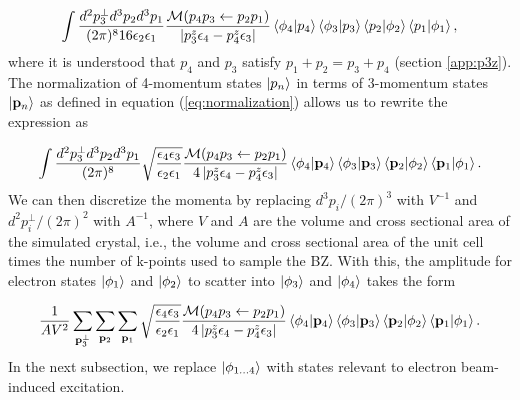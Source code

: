 \documentclass{article}
\begin{document}
\begin{equation} 
  \label{eq:ampUseDelta} 
  \begin{aligned} 
    \int\frac{d^2p_3^\perp
    d^3p_2d^3p_1} {(2\pi)^{8} 16\epsilon_2\epsilon_1}
    \frac{\mathcal{M}(p_4p_3\leftarrow p_2p_1)}
    {\left|p_3^z\epsilon_4 - p_4^z\epsilon_3\right|} \bra{\phi_4}\ket{p_4}
    \bra{\phi_3}\ket{p_3} \bra{p_2}\ket{\phi_2} \bra{p_1}\ket{\phi_1},
  \end{aligned} 
\end{equation}
%
where it is understood that $p_4$ and $p_3$ satisfy $p_1 + p_2 = p_3 + p_4$
(section \ref{app:p3z}).
The normalization of 4-momentum states $\ket{p_n}$ in terms of
3-momentum states $\ket{\mathbf{p}_n}$ as defined in equation
(\ref{eq:normalization}) allows us to rewrite the expression as

\begin{equation} 
  \label{eq:amp3Mom} 
  \begin{aligned} 
    \int\frac{d^2p_3^\perp
    d^3p_2d^3p_1}{(2\pi)^{8}}
    \sqrt{\frac{\epsilon_4\epsilon_3}{\epsilon_2\epsilon_1}}
    \frac{\mathcal{M}(p_4p_3\leftarrow p_2p_1)} {4\left|p_3^z\epsilon_4 -
    p_4^z\epsilon_3\right|} \bra{\phi_4}\ket{\mathbf{p}_4}
    \bra{\phi_3}\ket{\mathbf{p}_3} \bra{\mathbf{p}_2}\ket{\phi_2}
    \bra{\mathbf{p}_1}\ket{\phi_1}.  
  \end{aligned} 
\end{equation}
%
We can then discretize the momenta by replacing $d^3p_i/(2\pi)^3$ with $V^{-1}$
and $d^2p_i^\perp/(2\pi)^2$ with $A^{-1}$, where $V$ and $A$ are the volume and
cross sectional area of the simulated crystal, i.e., the volume and
cross sectional area of the unit cell times the number of k-points used to
sample the BZ.
With this, the amplitude for electron states $\ket{\phi_1}$ and $\ket{\phi_2}$
to scatter into $\ket{\phi_3}$ and $\ket{\phi_4}$ takes the form

\begin{equation} 
  \label{eq:ampDisc} 
  \begin{aligned} 
    \frac{1}{AV^2}
    \sum_{\mathbf{p}_3^\perp} \sum_{\mathbf{p}_2} \sum_{\mathbf{p}_1}
    \sqrt{\frac{\epsilon_4\epsilon_3}{\epsilon_2\epsilon_1}}
    \frac{\mathcal{M}(p_4p_3\leftarrow p_2p_1)} {4\left|p_3^z\epsilon_4 -
    p_4^z\epsilon_3\right|} \bra{\phi_4}\ket{\mathbf{p}_4}
    \bra{\phi_3}\ket{\mathbf{p}_3} \bra{\mathbf{p}_2}\ket{\phi_2}
    \bra{\mathbf{p}_1}\ket{\phi_1}.  
  \end{aligned} 
\end{equation}
%
In the next subsection, we replace $\ket{\phi_{1\dots 4}}$ with states relevant to
electron beam-induced excitation.
\end{document}
